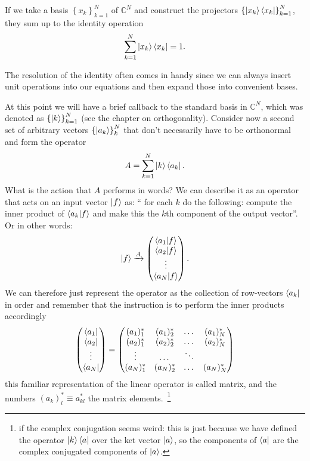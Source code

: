 \begin{theorem*}
    If we take a basis $\left\{ x_k \right\}_{k=1}^N$ of $\mathbb{C}^N$ and construct the projectors $\left\{ \ket{x_k}\bra{x_k}\right\}_{k=1}^N$, they sum up to the identity operation
    \begin{align*}
        \sum_{k=1}^N \ket{x_k}\bra{x_k} = 1.
    \end{align*}
\end{theorem*}
The resolution of the identity often comes in handy since we can always insert unit operations into our equations and then expand those into convenient bases.

At this point we will have a brief callback to the standard basis in $\mathbb{C}^N$, which was denoted as $\left\{\ket{k}\right\}_{k=1}^N$ (see the chapter on orthogonality). 
Consider now a second set of arbitrary vectors $\left\{\ket{a_k}\right\}_{k}^N$ that don't necessarily have to be orthonormal and form the operator
\begin{align*}
    A = \sum_{k=1}^N \ket{k}\bra{a_k}.
\end{align*}
What is the action that $A$ performs in words? We can describe it as an operator that acts on an input vector $\ket{f}$ as: `` for each $k$ do the following: compute the inner product of $\bra{a_k}\ket{f}$ and make this the $k$th component of the output vector''.
Or in other words:
\begin{align}
    \ket{f} \xrightarrow[]{A} \begin{pmatrix}
        \bra{a_1}\ket{f} \\ \bra{a_2}\ket{f} \\ \vdots \\ \bra{a_N}\ket{f}
    \end{pmatrix}.
\end{align}
We can therefore just represent the operator as the collection of row-vectors $\bra{a_k}$ in order and remember that the instruction is to perform the inner products accordingly 
\begin{align}
    \begin{pmatrix}
       \bra{a_1}\\ \bra{a_2} \\ \vdots \\ \bra{a_N}
    \end{pmatrix} = \begin{pmatrix}
        (a_1)_1^* & (a_1)_2^* & \dots & (a_1)_N^* \\
        (a_2)_1^* & (a_2)_2^* & \dots & (a_2)_N^* \\
        \vdots & \dots & \ddots & \\
        (a_N)_1^* & (a_N)_2^* & \dots & (a_N)_N^* \\
    \end{pmatrix}
\end{align}
this familiar representation of the linear operator is called matrix, and the numbers $(a_k)_l^\ast \equiv a_{kl}^\ast$ the matrix elements.~\footnote{if the complex conjugation seems weird: this is just because we have defined the operator $\ket{k}\bra{a}$ over the ket vector $\ket{a}$, so the components of $\bra{a}$ are the complex conjugated components of $\ket{a}$.}

